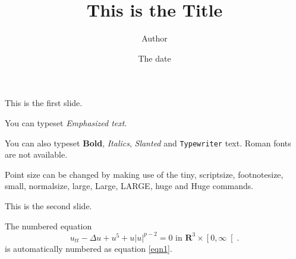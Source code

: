 \documentclass[titlepage,leqno]{slides}%
\begin{document}
\title{This is the Title}
\author{Author}
\date{The date}
\maketitle
\begin{slide}{1}

This is the first slide.

You can typeset \emph{Emphasized text}.

You can also typeset  \textbf{Bold}, \textit{Italics},
\textsl{Slanted} and \texttt{Typewriter} text. Roman fonts are not
available.

Point size can be changed by making use of the {\tiny tiny},
{\scriptsize scriptsize}, {\footnotesize footnotesize}, {\small
small}, {\normalsize normalsize}, {\large large}, {\Large Large},
{\LARGE LARGE}, {\huge huge} and {\Huge Huge} commands.

\end{slide}
\begin{slide}{2}
This is the second slide.

The numbered equation
\begin{equation}
u_{tt}-\Delta u+u^{5}+u\left|  u\right|  ^{p-2}=0\text{ in }\mathbf{R}%
^{3}\times\left[  0,\infty\right[  .\label{eqn1}%
\end{equation}
is automatically numbered as equation \ref{eqn1}.

\end{slide}
\end{document}
